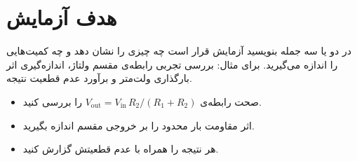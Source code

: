 \section{هدف آزمایش}

در دو یا سه جمله بنویسید آزمایش قرار است چه چیزی را نشان دهد و چه کمیت‌هایی را اندازه می‌گیرید.
برای مثال: بررسی تجربی رابطه‌ی مقسم ولتاژ، اندازه‌گیری اثر بارگذاری ولت‌متر و برآورد عدم قطعیت نتیجه.

\begin{notebox}[اهداف]
\begin{itemize}
  \item صحت رابطه‌ی $V_\mathrm{out}=V_\mathrm{in}\,R_2/(R_1+R_2)$ را بررسی کنید.
  \item اثر مقاومت بار محدود را بر خروجی مقسم اندازه بگیرید.
  \item هر نتیجه را همراه با عدم قطعیتش گزارش کنید.
\end{itemize}
\end{notebox}
